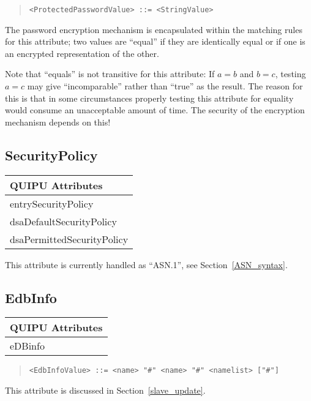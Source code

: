\begin{quote}\begin{verbatim}
<ProtectedPasswordValue> ::= <StringValue>
\end{verbatim}\end{quote}

The password encryption mechanism is encapsulated within the matching rules
for this attribute; two values are ``equal'' if they are identically equal or
if one is an encrypted representation of the other. 

Note that ``equals'' is not transitive for this attribute:
If $a = b$ and $b = c$, testing $a = c$ may give ``incomparable'' rather than
``true'' as the result. The reason for this is that in some circumstances 
properly testing
this attribute for equality would consume an unacceptable amount of time. The
security of the encryption mechanism depends on this!

\subsection{SecurityPolicy}
\begin{center}\small
\begin{tabular}{|l|}\hline
QUIPU Attributes \\ \hline
	entrySecurityPolicy\\
	dsaDefaultSecurityPolicy\\
	dsaPermittedSecurityPolicy\\
\hline
\end{tabular}
\end{center}

This attribute is currently handled as ``ASN.1'', see Section~\ref{ASN_syntax}.

\subsection{EdbInfo}
\begin{center}\small
\begin{tabular}{|l|}\hline
QUIPU Attributes \\ \hline
	eDBinfo\\
\hline
\end{tabular}
\end{center}
\begin{quote}\begin{verbatim}
<EdbInfoValue> ::= <name> "#" <name> "#" <namelist> ["#"]
\end{verbatim}\end{quote}
This attribute is discussed in Section~\ref{slave_update}.

